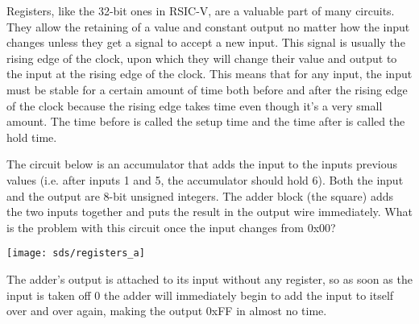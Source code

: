 \begin{blocksection}
\question
Registers, like the 32-bit ones in RSIC-V, are a valuable part of many circuits.  They allow the retaining of a value and constant output no matter how the input changes unless they get a signal to accept a new input.  This signal is usually the rising edge of the clock, upon which they will change their value and output to the input at the rising edge of the clock.  This means that for any input, the input must be stable for a certain amount of time both before and after the rising edge of the clock because the rising edge takes time even though it’s a very small amount.  The time before is called the setup time and the time after is called the hold time.

The circuit below is an accumulator that adds the input to the inputs previous values (i.e. after inputs 1 and 5, the accumulator should hold 6).  Both the input and the output are 8-bit unsigned integers.  The adder block (the square) adds the two inputs together and puts the result in the output wire immediately.  What is the problem with this circuit once the input changes from 0x00?

\texttt{[image: sds/registers\_a]}

\begin{solution}[0.5in]
The adder’s output is attached to its input without any register, so as soon as the input is taken
off 0 the adder will immediately begin to add the input to itself over and over again, making the
output 0xFF in almost no time.
\end{solution}

\end{blocksection}